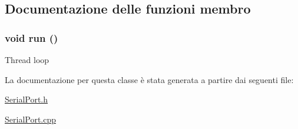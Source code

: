 \subsection{Documentazione delle funzioni membro}
\hypertarget{classSerialPort_13a43e6d814de94978c515cb084873b1}{
\subsubsection[run]{\setlength{\rightskip}{0pt plus 5cm}void run ()}}
\label{classSerialPort_13a43e6d814de94978c515cb084873b1}


Thread loop 

La documentazione per questa classe \`{e} stata generata a partire dai seguenti file:\begin{CompactItemize}
\item 
\hyperlink{SerialPort_8h}{Serial\-Port.h}\item 
\hyperlink{SerialPort_8cpp}{Serial\-Port.cpp}\end{CompactItemize}
